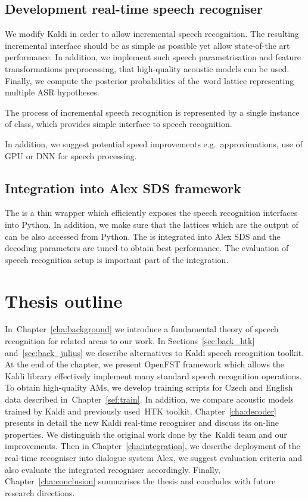 \subsection{Development real-time speech recogniser} 
\label{sub:compare_rt}

We modify Kaldi  in order to allow incremental speech recognition.
The resulting incremental interface should be as simple as possible yet allow state-of-the art performance.
In addition, we implement such speech parametrisation and feature transformations preprocessing, that high-quality acoustic models can be used.
Finally, we compute the posterior probabilities of the~word lattice representing multiple \ac{ASR} hypotheses.

The process of incremental speech recognition is represented by a single instance of  class,
which provides simple interface to speech recognition.

In addition, we suggest potential speed improvements e.g.\ approximations, use of \ac{GPU} 
or \ac{DNN} for speech processing\cite{vesely2013sequencediscriminative}.

\subsection[Integration into Alex \acs{SDS} framework]{Integration into Alex \acl{SDS} framework} 
\label{sub:integration}
The  is a thin wrapper which efficiently exposes the speech recognition interfaces  into Python.
In addition, we make sure that the lattices which are the output of  can be also accessed from Python.
The  is integrated into Alex \ac{SDS} and the decoding parameters are tuned to obtain best performance.
The evaluation of speech recognition setup is important part of the integration.

\section*{Thesis outline} 
In~Chapter~\ref{cha:background} we introduce a fundamental theory of speech recognition for related areas to our work.
In Sections~\ref{sec:back_htk} and~\ref{sec:back_julius} we describe alternatives to Kaldi speech recognition toolkit. 
At the end of the chapter, we present OpenFST framework which allows the Kaldi library effectively implement many standard speech recognition operations. 
To obtain high-quality \aclp{AM}, we develop training scripts for Czech and English data described in~Chapter~\ref{sef:train}. 
In addition, we compare acoustic models trained by Kaldi and previously used~\ac{HTK} toolkit. 
Chapter~\ref{cha:decoder} presents in detail the new Kaldi real-time recogniser and discuss its on-line properties.
We distinguish the original work done by the~Kaldi team and our improvements. 
Then in Chapter~\ref{cha:integration}, we describe deployment of the real-time recogniser into dialogue system Alex, we suggest evaluation criteria and also evaluate the integrated recogniser accordingly.
Finally, Chapter~\ref{cha:conclusion} summarises the thesis and concludes with future research directions.

